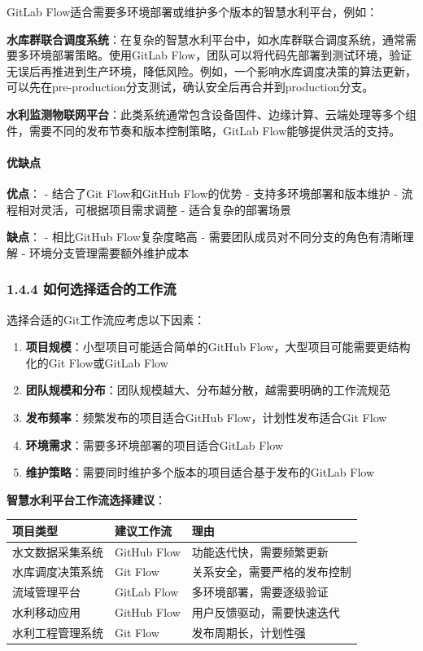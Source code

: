 GitLab Flow适合需要多环境部署或维护多个版本的智慧水利平台，例如：

\textbf{水库群联合调度系统}：在复杂的智慧水利平台中，如水库群联合调度系统，通常需要多环境部署策略。使用GitLab
Flow，团队可以将代码先部署到测试环境，验证无误后再推进到生产环境，降低风险。例如，一个影响水库调度决策的算法更新，可以先在pre-production分支测试，确认安全后再合并到production分支。

\textbf{水利监测物联网平台}：此类系统通常包含设备固件、边缘计算、云端处理等多个组件，需要不同的发布节奏和版本控制策略，GitLab
Flow能够提供灵活的支持。

\paragraph{优缺点}\label{ux4f18ux7f3aux70b9-2}

\textbf{优点}： - 结合了Git Flow和GitHub Flow的优势 -
支持多环境部署和版本维护 - 流程相对灵活，可根据项目需求调整 -
适合复杂的部署场景

\textbf{缺点}： - 相比GitHub Flow复杂度略高 -
需要团队成员对不同分支的角色有清晰理解 - 环境分支管理需要额外维护成本

\subsubsection{1.4.4
如何选择适合的工作流}\label{ux5982ux4f55ux9009ux62e9ux9002ux5408ux7684ux5de5ux4f5cux6d41}

选择合适的Git工作流应考虑以下因素：

\begin{enumerate}
\def\labelenumi{\arabic{enumi}.}
\tightlist
\item
  \textbf{项目规模}：小型项目可能适合简单的GitHub
  Flow，大型项目可能需要更结构化的Git Flow或GitLab Flow
\item
  \textbf{团队规模和分布}：团队规模越大、分布越分散，越需要明确的工作流规范
\item
  \textbf{发布频率}：频繁发布的项目适合GitHub Flow，计划性发布适合Git
  Flow
\item
  \textbf{环境需求}：需要多环境部署的项目适合GitLab Flow
\item
  \textbf{维护策略}：需要同时维护多个版本的项目适合基于发布的GitLab Flow
\end{enumerate}

\textbf{智慧水利平台工作流选择建议}：

\begin{longtable}[]{@{}lll@{}}
\toprule\noalign{}
项目类型 & 建议工作流 & 理由 \\
\midrule\noalign{}
\endhead
\bottomrule\noalign{}
\endlastfoot
水文数据采集系统 & GitHub Flow & 功能迭代快，需要频繁更新 \\
水库调度决策系统 & Git Flow & 关系安全，需要严格的发布控制 \\
流域管理平台 & GitLab Flow & 多环境部署，需要逐级验证 \\
水利移动应用 & GitHub Flow & 用户反馈驱动，需要快速迭代 \\
水利工程管理系统 & Git Flow & 发布周期长，计划性强 \\
\end{longtable}

